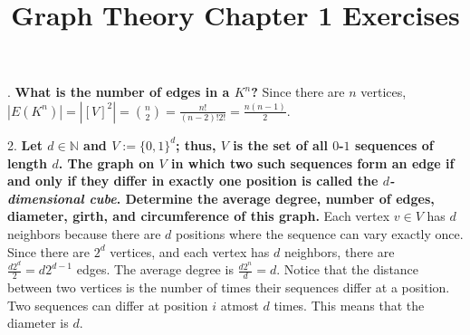 \documentclass{article}
\title{Graph Theory Chapter 1 Exercises}
\begin{document}
. \textbf{What is the number of edges in a $K^n$?}
Since there are $n$ vertices, $|E(K^n)| = |[V]^2| = \binom{n}{2} =
    \frac{n!}{(n-2)!2!} = \frac{n(n-1)}{2}$.

2. \textbf{Let $d \in \mathbb{N}$ and $V := \{0, 1\}^d$; thus, $V$ is the
    set of all $0$-$1$ sequences of length $d$. The graph on $V$ in which
    two such sequences form an edge if and only if they differ in exactly one position
    is called the \emph{$d$-dimensional cube}. Determine the average degree, number of
    edges, diameter, girth, and circumference of this graph.} Each vertex $v \in V$
has $d$ neighbors because there are $d$ positions where the sequence can vary exactly
once. Since there are $2^d$ vertices, and each vertex has $d$ neighbors, there are
$\frac{d2^d}{2} = d2^{d-1}$ edges. The average degree is $\frac{d2^n}{d} = d$. Notice
that the distance between two vertices is the number of times their sequences
differ at a position. Two sequences can differ at position $i$ atmost $d$ times.
This means that the diameter is $d$.
\end{document}
